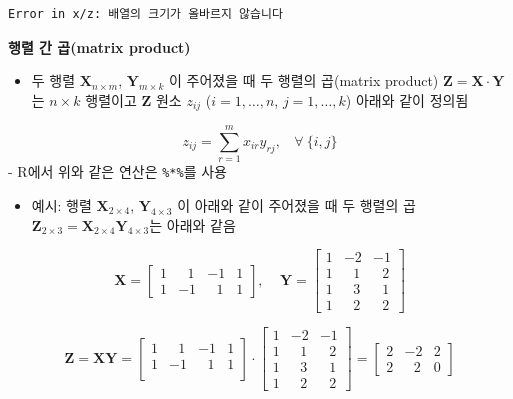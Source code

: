 \documentclass[
  11pt,
]{krantz}
\providecommand{\tightlist}{%
  \setlength{\itemsep}{0pt}\setlength{\parskip}{0pt}}
\begin{document}
\begin{verbatim}
Error in x/z: 배열의 크기가 올바르지 않습니다
\end{verbatim}

\normalsize

\textbf{행렬 간 곱(matrix product)}

\begin{itemize}
\tightlist
\item
  두 행렬 \(\mathrm{\mathbf X}_{n\times m}\), \(\mathrm{\mathbf Y}_{m\times k}\) 이 주어졌을 때 두 행렬의 곱(matrix product) \(\mathrm{\mathbf Z} = \mathrm{\mathbf {X\cdot Y}}\)는 \(n \times k\) 행렬이고 \(\mathrm{\mathbf Z}\) 원소 \(z_{ij}\) (\(i={1,\ldots,n}\), \(j={1,\ldots,k}\)) 아래와 같이 정의됨
\end{itemize}

\[
 z_{ij} = \sum_{r=1}^{m}x_{ir}y_{rj},~~~~\forall~\{i, j\}
\]
- R에서 위와 같은 연산은 \texttt{\%*\%}를 사용

\begin{itemize}
\tightlist
\item
  예시: 행렬 \(\mathrm{\mathbf X}_{2\times 4}\), \(\mathrm{\mathbf Y}_{4\times 3}\) 이 아래와 같이 주어졌을 때 두 행렬의 곱 \(\mathrm{\mathbf Z}_{2\times 3} = \mathrm{\mathbf{X}}_{2\times 4}\mathrm{\mathbf{Y}}_{4 \times 3}\)는 아래와 같음
\end{itemize}

\[
\mathrm{\mathbf X}=
\begin{bmatrix}
1 &~~~ 1 &   -1 & 1 \\
1 &   -1 &~~~ 1 & 1
\end{bmatrix}, ~~~~~
\mathrm{\mathbf{Y}}=
\begin{bmatrix}
1 &  -2 &  -1 \\
1 &~~~1 &~~~2 \\
1 &~~~3 &~~~1 \\
1 &~~~2 &~~~2
\end{bmatrix}
\]

\[
\mathrm{\mathbf{Z}} = \mathrm{\mathbf{X}}\mathrm{\mathbf{Y}} = 
\begin{bmatrix}
1 &~~~ 1 &   -1 & 1 \\
1 &   -1 &~~~ 1 & 1 \\ 
\end{bmatrix} \cdot  
\begin{bmatrix}
1 &  -2 &  -1 \\
1 &~~~1 &~~~2 \\ 
1 &~~~3 &~~~1 \\
1 &~~~2 &~~~2 
\end{bmatrix} 
 = 
\begin{bmatrix}
2  &  -2 & 2 \\
2  &~~~2 & 0 
\end{bmatrix}
\]
\end{document}
